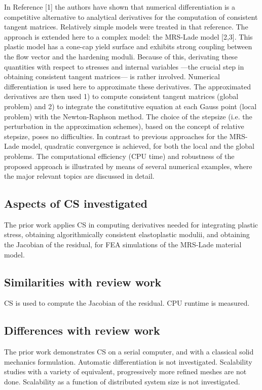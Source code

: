 \documentclass[10pt,letterpaper,draft]{article}
\begin{document}
In Reference [1] the authors have shown that numerical differentiation is a
competitive alternative to analytical derivatives for the computation of
consistent tangent matrices. Relatively simple models were treated in that
reference. The approach is extended here to a complex model: the MRS-Lade model
[2,3]. This plastic model has a cone-cap yield surface and exhibits strong
coupling between the flow vector and the hardening moduli. Because of this,
derivating these quantities with respect to stresses and internal variables
—the crucial step in obtaining consistent tangent matrices— is rather involved.
Numerical differentiation is used here to approximate these derivatives. The
approximated derivatives are then used 1) to compute consistent tangent
matrices (global problem) and 2) to integrate the constitutive equation at each
Gauss point (local problem) with the Newton-Raphson method. The choice of the
stepsize (i.e. the perturbation in the approximation schemes), based on the
concept of relative stepsize, poses no difficulties. In contrast to previous
approaches for the MRS-Lade model, quadratic convergence is achieved, for both
the local and the global problems. The computational efficiency (CPU time) and
robustness of the proposed approach is illustrated by means of several
numerical examples, where the major relevant topics are discussed in detail.

\subsection{Aspects of CS investigated}

The prior work applies CS in computing derivatives needed for integrating
plastic stress, obtaining algorithmically consistent elastoplastic modulii, and
obtaining the Jacobian of the residual, for FEA simulations of the MRS-Lade material
model.

\subsection{Similarities with review work}

CS is used to compute the Jacobian of the residual. CPU runtime is measured.

\subsection{Differences with review work}

The prior work demonstrates CS on a serial computer, and with a classical solid
mechanics formulation. Automatic differentiation is not investigated.
Scalability studies with a variety of equivalent, progressively more refined
meshes are not done. Scalability as a function of distributed system size is
not investigated.
\end{document}
